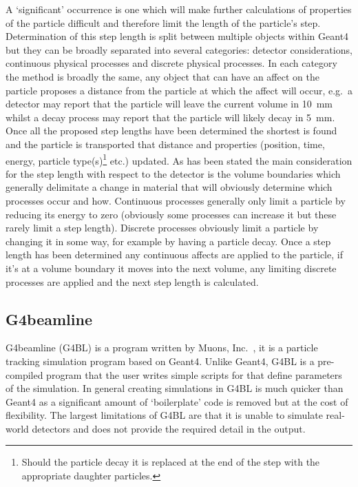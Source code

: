 A `significant' occurrence is one which will make further calculations of properties of the particle difficult and therefore limit the length of the particle's step. Determination of this step length is split between multiple objects within Geant4 but they can be broadly separated into several categories: detector considerations, continuous physical processes and discrete physical processes. In each category the method is broadly the same, any object that can have an affect on the particle proposes a distance from the particle at which the affect will occur, e.g.\ a detector may report that the particle will leave the current volume in 10~mm whilst a decay process may report that the particle will likely decay in 5~mm. Once all the proposed step lengths have been determined the shortest is found and the particle is transported that distance and properties (position, time, energy, particle type(s)\footnote{Should the particle decay it is replaced at the end of the step with the appropriate daughter particles.} etc.)
updated. As has been stated the main consideration for the step length with respect to the detector is the volume boundaries which generally delimitate a change in material that will obviously determine which processes occur and how. Continuous processes generally only limit a particle by reducing its energy to zero (obviously some processes can increase it but these rarely limit a step length). Discrete processes obviously limit a particle by changing it in some way, for example by having a particle decay. Once a step length has been determined any continuous affects are applied to the particle, if it's at a volume boundary it moves into the next volume, any limiting discrete processes are applied and the next step length is calculated. 


\subsection{G4beamline} %
\label{sec:g4beamline}
G4beamline (G4BL) is a program written by Muons, Inc.~\cite{G4BL ref}, it is a particle tracking simulation program based on Geant4. Unlike Geant4, G4BL is a pre-compiled program that the user writes simple scripts for that define parameters of the simulation. In general creating simulations in G4BL is much quicker than Geant4 as a significant amount of `boilerplate' code is removed but at the cost of flexibility. The largest limitations of G4BL are that it is unable to simulate real-world detectors and does not provide the required detail in the output. 

